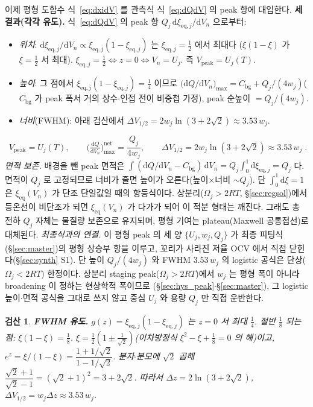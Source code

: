 \documentclass[11pt,a4paper]{article}
\newtheorem*{verifybox}{검산}
\newcommand{\dd}{\mathrm{d}}
\newcommand{\eq}{\mathrm{eq}}
\newcommand{\bg}{\mathrm{bg}}
\newcommand{\peak}{\mathrm{peak}}
\begin{document}
이제 평형 도함수 식~\eqref{eq:dxidV} 를 관측식 식~\eqref{eq:dQdV} 의 peak 항에 대입한다.
\textbf{세 결과(각각 유도).} 식~\eqref{eq:dQdV} 의 peak 항 $Q_j\,\dd\xi_{\eq,j}/\dd V_n$ 으로부터:
\begin{itemize}[leftmargin=1.6em,itemsep=2pt]
\item \emph{위치}: $\dd\xi_{\eq,j}/\dd V_n\propto\xi_{\eq,j}(1-\xi_{\eq,j})$ 는 $\xi_{\eq,j}=\tfrac12$ 에서 최대다
  ($\xi(1-\xi)$ 가 $\xi=\tfrac12$ 서 최대). $\xi_{\eq,j}=\tfrac12\Leftrightarrow z=0\Leftrightarrow V_n=U_j$. 즉
  $V_\peak=U_j(T)$.
\item \emph{높이}: 그 점에서 $\xi_{\eq,j}(1-\xi_{\eq,j})=\tfrac14$ 이므로
  $\big(\dd Q/\dd V_n\big)_{\max}=C_\bg+Q_j/(4w_j)$($C_\bg$ 가 peak 폭서 거의 상수$\cdot$인접 전이 비중첩 가정), peak 순높이 $=Q_j/(4w_j)$.
\item \emph{너비}(FWHM): 아래 검산에서 $\Delta V_{1/2}=2w_j\ln(3+2\sqrt2)\approx3.53\,w_j$.
\end{itemize}
\begin{equation}
\boxed{\;V_\peak=U_j(T),\qquad \Big(\tfrac{\dd Q}{\dd V_n}\Big)^{\text{net}}_{\max}=\frac{Q_j}{4w_j},\qquad
\Delta V_{1/2}=2w_j\ln(3+2\sqrt2)\approx3.53\,w_j\;.}
\label{eq:eqpeak}
\end{equation}
\emph{면적 보존.} 배경을 뺀 peak 면적은 $\int(\dd Q/\dd V_n-C_\bg)\,\dd V_n=Q_j\int_0^1\dd\xi_{\eq,j}=Q_j$ 다.
면적이 $Q_j$ 로 고정되므로 너비가 줄면 높이가 오른다(높이$\times$너비 $\sim Q_j$). 단 $\int_0^1\dd\xi=1$ 은
$\xi_{\eq}(V_n)$ 가 단조 단일값일 때의 항등식이다. 상분리($\Omega_j>2RT$, \S\ref{sec:regsol})에서 등온선이
비단조가 되면 $\xi_{\eq}(V_n)$ 가 다가가 되어 이 적분 형태는 깨진다. 그래도 총 전하 $Q_j$ 자체는 물질량 보존으로
유지되며, 평형 기여는 plateau(Maxwell 공통접선)로 대체된다. \emph{최종식과의 연결.} 이 평형 peak 의 세 양
$\{U_j,w_j,Q_j\}$ 가 최종 피팅식(\S\ref{sec:master})의 평형 상승부 항을 이루고, 꼬리가 사라진 저율 OCV 에서 직접
닫힌다(\S\ref{sec:synth} S1). 단 높이 $Q_j/(4w_j)$ 와 FWHM $3.53\,w_j$ 의 logistic 공식은 단상($\Omega_j<2RT$)
한정이다. 상분리 staging peak($\Omega_j>2RT$)에서 $w_j$ 는 평형 폭이 아니라 broadening 이 정하는 현상학적 폭이므로
(\S\ref{sec:hys_peak}$\cdot$\S\ref{sec:master}), 그 logistic 높이$\cdot$면적 공식을 그대로 쓰지 않고 중심 $U_j$ 와
용량 $Q_j$ 만 직접 운반한다.

\begin{verifybox}
\textbf{FWHM 유도.} $g(z)=\xi_{\eq,j}(1-\xi_{\eq,j})$ 는 $z=0$ 서 최대 $\tfrac14$. 절반 $\tfrac18$ 되는 점:
$\xi(1-\xi)=\tfrac18$. $\xi=\tfrac12(1\pm\tfrac1{\sqrt2})$(이차방정식 $\xi^2-\xi+\tfrac18=0$ 의 해)이고,
$e^z=\xi/(1-\xi)=\dfrac{1+1/\sqrt2}{1-1/\sqrt2}$. 분자$\cdot$분모에 $\sqrt2$ 곱해 $\dfrac{\sqrt2+1}{\sqrt2-1}
=(\sqrt2+1)^2=3+2\sqrt2$. 따라서 $\Delta z=2\ln(3+2\sqrt2)$, $\Delta V_{1/2}=w_j\Delta z\approx3.53\,w_j$.
\end{verifybox}
\end{document}
